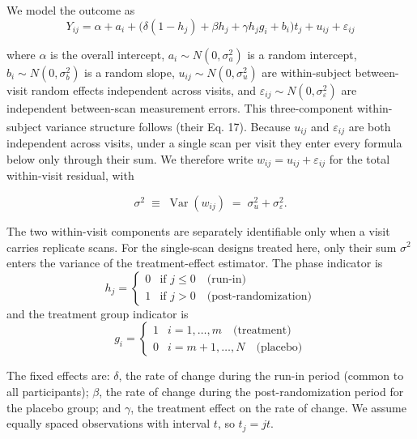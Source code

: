 \documentclass[
  11pt,
]{article}
\begin{document}
We model the outcome as
\begin{equation}
  Y_{ij} = \alpha + a_i +
  \bigl(\delta(1-h_j) + \beta h_j + \gamma h_j g_i + b_i
  \bigr) t_j + u_{ij} + \varepsilon_{ij}
  \label{eq:model}
\end{equation}

where \(\alpha\) is the overall intercept, \(a_i \sim N(0,
\sigma_a^2)\) is a random intercept, \(b_i \sim N(0,
\sigma_b^2)\) is a random slope, \(u_{ij} \sim N(0,
\sigma_u^2)\) are within-subject between-visit random
effects independent across visits, and \(\varepsilon_{ij}
\sim N(0, \sigma_\varepsilon^2)\) are independent
between-scan measurement errors. This three-component
within-subject variance structure follows\textsuperscript{} (their Eq. 17). Because
\(u_{ij}\) and \(\varepsilon_{ij}\) are both independent across
visits, under a single scan per visit they enter every
formula below only through their sum. We therefore write
\(w_{ij} = u_{ij} + \varepsilon_{ij}\) for the total
within-visit residual, with

\begin{equation}
  \sigma^2 \;\equiv\; \mathop{\mathrm{Var}}(w_{ij}) \;=\; \sigma_u^2 +
  \sigma_\varepsilon^2 .
  \label{eq:resid}
\end{equation}

The two within-visit components are separately identifiable
only when a visit carries replicate scans. For the single-scan
designs treated here, only their sum \(\sigma^2\) enters the
variance of the treatment-effect estimator. The phase indicator
is
\[
  h_j =
  \begin{cases}
    0 & \text{if } j \le 0 \quad \text{(run-in)} \\
    1 & \text{if } j > 0 \quad \text{(post-randomization)}
  \end{cases}
\]
and the treatment group indicator is
\[
  g_i =
  \begin{cases}
    1 & i = 1, \ldots, m
      \quad \text{(treatment)} \\
    0 & i = m+1, \ldots, N
      \quad \text{(placebo)}
  \end{cases}
\]

The fixed effects are: \(\delta\), the rate of change during the
run-in period (common to all participants); \(\beta\), the rate
of change during the post-randomization period for the placebo
group; and \(\gamma\), the treatment effect on the rate of
change. We assume equally spaced observations with interval
\(t\), so \(t_j = jt\).
\end{document}
